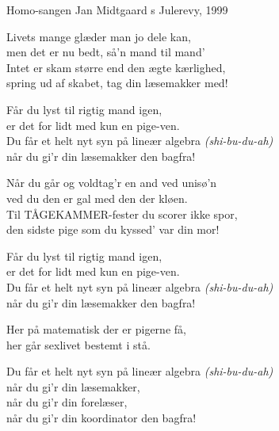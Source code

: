 \begin{song}{Homo-sangen}
  {} %
  {\SBOrgMel} %
  {Jan Midtgaard} %
  {\TKET{}s Julerevy, 1999} %
  {\NotCCLIed} %

  \begin{SBVerse}
    Livets mange glæder man jo dele kan,\\
    men det er nu bedt, så'n mand til mand'\\
    Intet er skam større end den ægte kærlighed,\\
    spring ud af skabet, tag din læsemakker med!
  \end{SBVerse}

  \begin{SBChorus}
    Får du lyst til rigtig mand igen,\\
    er det for lidt med kun en pige-ven.\\
    Du får et helt nyt syn på lineær algebra \emph{(shi-bu-du-ah)}\\
    når du gi’r din læsemakker den bagfra!
  \end{SBChorus}

  \begin{SBVerse}
    Når du går og voldtag’r en and ved unisø’n\\
    ved du den er gal med den der kløen.\\
    Til TÅGEKAMMER-fester du scorer ikke spor,\\
    den sidste pige som du kyssed’ var din mor!
  \end{SBVerse}

  \begin{SBChorus}
    Får du lyst til rigtig mand igen,\\
    er det for lidt med kun en pige-ven.\\
    Du får et helt nyt syn på lineær algebra \emph{(shi-bu-du-ah)}\\
    når du gi’r din læsemakker den bagfra!
  \end{SBChorus}


  \begin{SBSection*}
    Her på matematisk der er pigerne få,\\
    her går sexlivet bestemt i stå.
  \end{SBSection*}

  \begin{SBChorus}
    Du får et helt nyt syn på lineær algebra \emph{(shi-bu-du-ah)}\\
    når du gi’r din læsemakker,\\
    når du gi'r din forelæser,\\
    når du gi'r din koordinator den bagfra!
  \end{SBChorus}
\end{song}